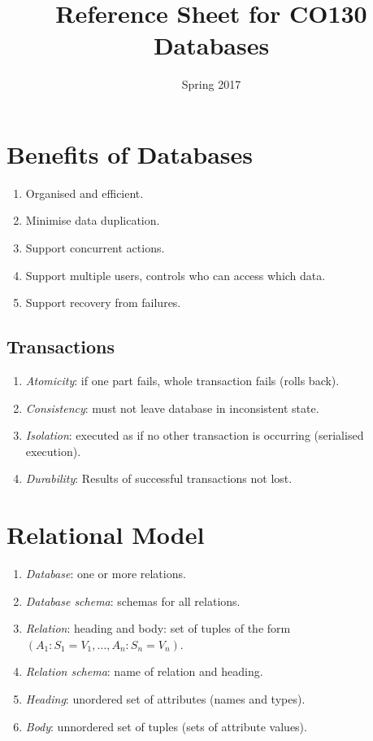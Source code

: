 \documentclass[twocolumn,english]{article}
\begin{document}
\title{Reference Sheet for CO130 Databases}


\date{Spring 2017}

\maketitle

\section{Benefits of Databases}
\begin{enumerate}
\item Organised and efficient. 
\item Minimise data duplication. 
\item Support concurrent actions. 
\item Support multiple users, controls who can access which data. 
\item Support recovery from failures. 
\end{enumerate}

\subsection{Transactions}
\begin{enumerate}
\item \emph{Atomicity}: if one part fails, whole transaction fails (rolls
back). 
\item \emph{Consistency}: must not leave database in inconsistent state. 
\item \emph{Isolation}: executed as if no other transaction is occurring
(serialised execution).
\item \emph{Durability}: Results of successful transactions not lost. 
\end{enumerate}

\section{Relational Model}
\begin{enumerate}
\item \emph{Database}: one or more relations. 
\item \emph{Database schema}: schemas for all relations. 
\item \emph{Relation}: heading and body: set of tuples of the form $\left(A_{1}:S_{1}=V_{1},\dots,A_{n}:S_{n}=V_{n}\right)$. 
\item \emph{Relation schema}: name of relation and heading. 
\item \emph{Heading}: unordered set of attributes (names and types). 
\item \emph{Body}: unnordered set of tuples (sets of attribute values). 
\end{enumerate}
\end{document}

